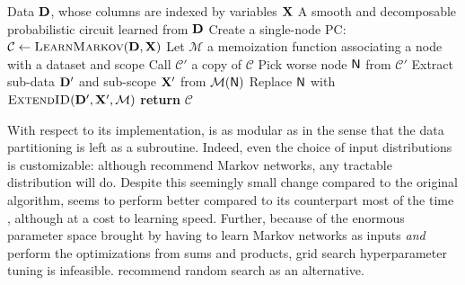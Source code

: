 \begin{algorithm}[t]
  \caption{}\label{alg:idspn}
  \begin{algorithmic}[1]
    \Require Data $\mathbf{D}$, whose columns are indexed by variables $\mathbf{X}$
    \Ensure A smooth and decomposable probabilistic circuit learned from $\mathbf{D}$
    \State Create a single-node PC: $\mathcal{C}\gets\textproc{LearnMarkov}(\set{D},\set{X})$
    \State Let $\mathcal{M}$ a memoization function associating a node with a dataset and scope
    \State Call $\mathcal{C}'$ a copy of $\mathcal{C}$
      \State Pick worse node $\operatorname{\textsf{N}}$ from $\mathcal{C}'$
      \State Extract sub-data $\mathbf{D}'$ and sub-scope $\mathbf{X}'$ from $\mathcal{M}(\operatorname{\textsf{N}})$
      \State Replace $\operatorname{\textsf{N}}$ with $\textproc{ExtendID}(\set{D}',\set{X}',\mathcal{M})$\label{alg:idspn:line:extend}
    \EndWhile
    \State \textbf{return} $\mathcal{C}$
  \end{algorithmic}
\end{algorithm}

With respect to its implementation,  is as modular as  in the
sense that the data partitioning is left as a subroutine. Indeed, even the choice of input
distributions is customizable: although \citeauthor{rooshenas14} recommend Markov networks, any
tractable distribution will do. Despite this seemingly small change compared to the original
 algorithm,  seems to perform better compared to its
counterpart most of the time \citep{rooshenas14,jaini18a}, although at a cost to learning speed.
Further, because of the enormous parameter space brought by having to learn Markov networks as
inputs \emph{and} perform the optimizations from sums and products, grid search hyperparameter
tuning is infeasible. \citep{rooshenas14} recommend random search \citep{bergstra12a} as an
alternative.

